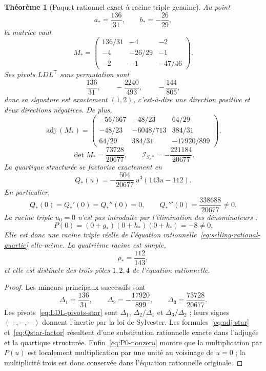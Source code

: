 \documentclass[11pt,a4paper]{article}
\newtheorem{theorem}{Théorème}[section]
\begin{document}
\begin{theorem}[Paquet rationnel exact à racine triple genuine]\label{thm:selling-explicit-triple}
Au point
\begin{equation}\label{eq:abstar}
 a_*=\frac{136}{31},\qquad b_*=-\frac{26}{29},
\end{equation}
la matrice vaut
\[
 M_*=
 \begin{pmatrix}
 136/31&-4&-2\\
 -4&-26/29&-1\\
 -2&-1&-47/46
 \end{pmatrix}.
\]
Ses pivots $LDL^{\mathsf T}$ sans permutation sont
\begin{equation}\label{eq:LDL-pivots-star}
 \frac{136}{31},\qquad -\frac{2240}{493},\qquad -\frac{144}{805},
\end{equation}
donc sa signature est exactement $(1,2)$, c'est-à-dire une direction positive et deux directions négatives. De plus,
\begin{equation}\label{eq:adj-star}
 \operatorname{adj}(M_*)=
 \begin{pmatrix}
 -56/667&-48/23&64/29\\
 -48/23&-6048/713&384/31\\
 64/29&384/31&-17920/899
 \end{pmatrix},
\end{equation}
\[
 \det M_*=\frac{73728}{20677},
 \qquad
 \mathcal I_{S,*}=-\frac{221184}{20677}.
\]
La quartique structurée se factorise exactement en
\begin{equation}\label{eq:Qstar-factor}
 \boxed{Q_*(u)=-\frac{504}{20677}\,u^3(143u-112).}
\end{equation}
En particulier,
\[
 Q_*(0)=Q_*'(0)=Q_*''(0)=0,
 \qquad
 Q_*'''(0)=\frac{338688}{20677}\neq0.
\]
La racine triple $u_0=0$ n'est pas introduite par l'élimination des dénominateurs :
\begin{equation}\label{eq:P0-nonzero}
 P(0)=(0+g_*)(0+h_*)(0+k_*)=-8\neq0.
\end{equation}
Elle est donc une racine triple réelle de l'équation rationnelle~\eqref{eq:selling-rational-quartic} elle-même. La quatrième racine est simple,
\[
 \rho_*=\frac{112}{143},
\]
et elle est distincte des trois pôles $1,2,4$ de l'équation rationnelle.
\end{theorem}

\begin{proof}
Les mineurs principaux successifs sont
\[
 \Delta_1=\frac{136}{31},\qquad
 \Delta_2=-\frac{17920}{899},\qquad
 \Delta_3=\frac{73728}{20677}.
\]
Les pivots~\eqref{eq:LDL-pivots-star} sont $\Delta_1$, $\Delta_2/\Delta_1$ et $\Delta_3/\Delta_2$ ; leurs signes $(+,-,-)$ donnent l'inertie par la loi de Sylvester. Les formules~\eqref{eq:adj-star} et~\eqref{eq:Qstar-factor} résultent d'une substitution rationnelle exacte dans l'adjugée et la quartique structurée. Enfin~\eqref{eq:P0-nonzero} montre que la multiplication par $P(u)$ est localement multiplication par une unité au voisinage de $u=0$ ; la multiplicité trois est donc conservée dans l'équation rationnelle originale.
\end{proof}
\end{document}
